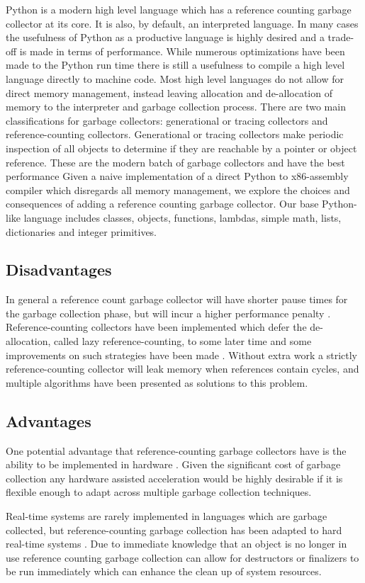 \documentclass{sigplanconf}
\begin{document}
Python is a modern high level language which has a reference counting garbage collector at its core.  It is also, by default, an interpreted language.  In many cases the usefulness of Python as a productive language is highly desired and a trade-off is made in terms of performance.  While numerous optimizations have been made to the Python run time there is still a usefulness to compile a high level language directly to machine code.  Most high level languages do not allow for direct memory management, instead leaving allocation and de-allocation of memory to the interpreter and garbage collection process.
There are two main classifications for garbage collectors: generational or tracing collectors and reference-counting collectors.  Generational or tracing collectors make periodic inspection of all objects to determine if they are reachable by a pointer or object reference.  These are the modern batch of garbage collectors and have the best performance 
Given a naive implementation of a direct Python to x86-assembly compiler which disregards all memory management, we explore the choices and consequences of adding a reference counting garbage collector.  Our base Python-like language includes classes, objects, functions, lambdas, simple math, lists, dictionaries and integer primitives.
\subsection{Disadvantages}
In general a reference count garbage collector will have shorter pause times for the garbage collection phase, but will incur a higher performance penalty \cite{joisha}\cite{blackburn}.  Reference-counting collectors have been implemented which defer the de-allocation, called lazy reference-counting, to some later time and some improvements on such strategies have been made \cite{boehm}.  Without extra work a strictly reference-counting collector will leak memory when references contain cycles, and multiple algorithms have been presented as solutions to this problem.
\subsection{Advantages}
One potential advantage that reference-counting garbage collectors have is the ability to be implemented in hardware \cite{joao}.  Given the significant cost of garbage collection \cite{hertz} any hardware assisted acceleration would be highly desirable if it is flexible enough to adapt across multiple garbage collection techniques. 
\par
Real-time systems are rarely implemented in languages which are garbage collected, but reference-counting garbage collection has been adapted to hard real-time systems \cite{ritzaou}.  Due to immediate knowledge that an object is no longer in use reference counting garbage collection can allow for destructors or finalizers to be run immediately which can enhance the clean up of system resources.
\end{document}
